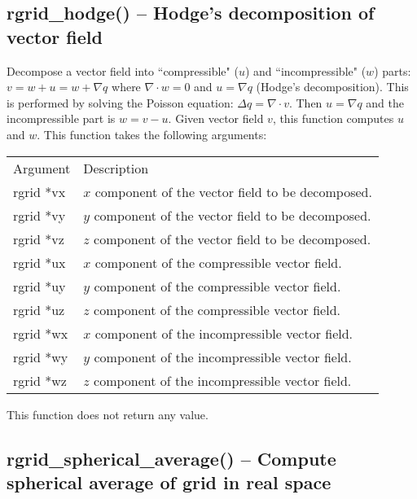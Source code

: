 \documentclass[12pt,letterpaper]{report}
\begin{document}
\subsection{rgrid\_hodge() -- Hodge's decomposition of vector field}

Decompose a vector field into ``compressible" ($u$) and ``incompressible" ($w$) parts: $v = w + u = w + \nabla q$ where $\nabla\cdot w = 0$ and $u = \nabla q$ (Hodge's decomposition). This is performed by solving the Poisson equation: $\Delta q = \nabla\cdot v$. Then $u = \nabla q$ and the incompressible part is $w = v - u$. Given vector field $v$, this function computes $u$ and $w$. This function takes the following arguments:
\begin{longtable}{p{} p{}}
Argument & Description\\
\cline{1-2}
rgrid *vx & $x$ component of the vector field to be decomposed.\\
rgrid *vy & $y$ component of the vector field to be decomposed.\\
rgrid *vz & $z$ component of the vector field to be decomposed.\\
rgrid *ux & $x$ component of the compressible vector field.\\
rgrid *uy & $y$ component of the compressible vector field.\\
rgrid *uz & $z$ component of the compressible vector field.\\
rgrid *wx & $x$ component of the incompressible vector field.\\
rgrid *wy & $y$ component of the incompressible vector field.\\
rgrid *wz & $z$ component of the incompressible vector field.\\
\end{longtable}
\noindent
This function does not return any value.

\subsection{rgrid\_spherical\_average() -- Compute spherical average of grid in real space}
\end{document}
